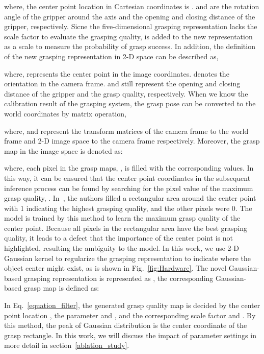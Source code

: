\documentclass[journal]{IEEEtran}
\begin{document}
where, the center point location in Cartesian coordinates is .  and  are the rotation angle of the gripper around the  axis and the opening and closing distance of the gripper, respectively. Sicne the five-dimensional grasping representation lacks the scale factor to evaluate the grasping quality,  is added to the new representation as a scale to measure the probability of grasp success. In addition, the definition of the new grasping representation in 2-D space can be described as,



where,  represents the center point in the image coordinates.  denotes the orientation in the camera frame.  and  still represent the opening and closing distance of the gripper and the grasp quality, respectively. When we know the calibration result of the grasping system, the grasp pose  can be converted to the world coordinates  by matrix operation,



where,  and  represent the transform matrices of the camera frame to the world frame and 2-D image space to the camera frame respectively. Moreover, the grasp map in the image space is denoted as:



where, each pixel in the grasp maps, , is filled with the corresponding  values. In this way, it can be ensured that the center point coordinates in the subsequent inference process can be found by searching for the pixel value of the maximum grasp quality, . In~\cite{ggcnn}, the authors filled a rectangular area around the center point with 1 indicating the highest grasping quality, and the other pixels were 0. The model is trained by this method to learn the maximum grasp quality of the center point. Because all pixels in the rectangular area have the best grasping quality, it leads to a defect that the importance of the center point is not highlighted, resulting the ambiguity to the model. In this work, we use 2-D Gaussian kernel to regularize the grasping representation to indicate where the object center might exist, as is shown in Fig.~\ref{fig:Hardware}. The novel Gaussian-based grasping representation is represented as , the corresponding Gaussian-based grasp map is defined as:

 



In Eq.~\ref{equation_filter}, the generated grasp quality map is decided by the center point location , the parameter  and , and the corresponding scale factor  and . By this method, the peak of Gaussian distribution is the center coordinate of the grasp rectangle. In this work, we will discuss the impact of parameter settings in more detail in section~\ref{ablation_study}.
\end{document}
